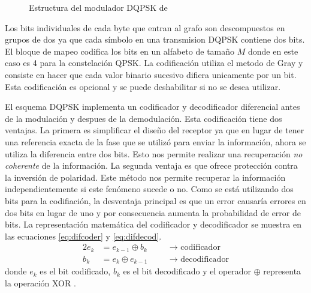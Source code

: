 \begin{figure}[bp]
  \centering
  \vspace{0.5in}
  \vspace{0.3in}
  \caption{Estructura del modulador DQPSK de \gnuradio}
  \label{fig:dqpsk}
\end{figure}

Los bits individuales de cada byte que entran al grafo son descompuestos en grupos de dos ya
que cada s\'imbolo en una transmision DQPSK contiene dos bits. El bloque de mapeo codifica los bits
en un alfabeto de tama\~no $M$ donde en este caso es 4 para la constelaci\'on QPSK. La
codificaci\'on utiliza el metodo de Gray y consiste en hacer que cada valor binario sucesivo difiera
unicamente por un bit. Esta codificaci\'on es opcional y se puede deshabilitar si no se desea utilizar. 

El esquema DQPSK implementa un codificador y decodificador diferencial antes de la modulaci\'on y
despues de la demodulaci\'on. Esta codificaci\'on tiene dos ventajas. La primera es simplificar el
dise\~no del receptor ya que en lugar de tener una referencia exacta de la fase que se utiliz\'o
para enviar la informaci\'on, ahora se utiliza la diferencia entre dos bits. Esto nos
permite realizar una recuperaci\'on \emph{no coherente} de la informaci\'on. La segunda ventaja es que
ofrece protecci\'on contra la inversi\'on de polaridad. Este m\'etodo nos permite recuperar la
informaci\'on independientemente si este fen\'omeno sucede o no. Como se est\'a utilizando dos bits
para la codifiaci\'on, la desventaja principal es que un error causar\'ia errores en dos bits en
lugar de uno y por consecuencia aumenta la probabilidad de error de bits. La representaci\'on
matem\'atica del codificador y decodificador se muestra en las ecuaciones \eqref{eq:difcoder} y
\eqref{eq:difdecod}.
\begin{alignat}{2}
e_k &=e_{k-1}\oplus b_k &\quad &\rightarrow \text{ codificador}\label{eq:difcoder}\\
b_k &=e_k \oplus e_{k-1} &\quad &\rightarrow \text{ decodificador}\label{eq:difdecod}
\end{alignat}
donde $e_k$ es el bit codificado, $b_k$ es el bit decodificado y el operador $\oplus$ representa la
operaci\'on XOR \cite{sklar}.

